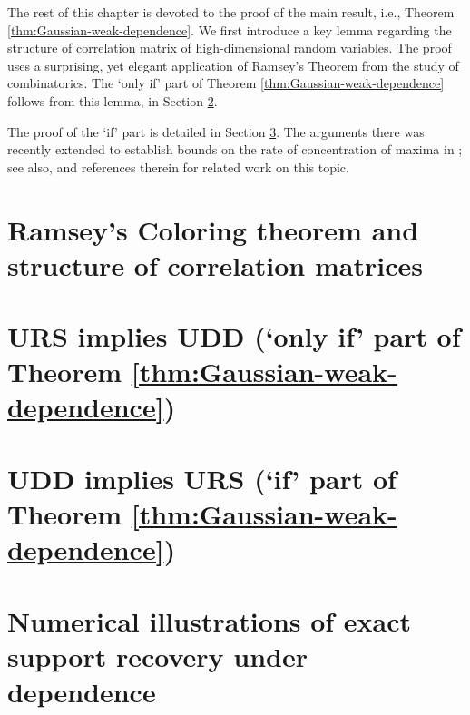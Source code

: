 
\medskip

The rest of this chapter is devoted to the proof of the main result, i.e., Theorem \ref{thm:Gaussian-weak-dependence}. 
We first introduce a key lemma regarding the structure of correlation matrix of high-dimensional random variables.
The proof uses a surprising, yet elegant application of Ramsey's Theorem from the study of combinatorics.
The `only if' part of Theorem \ref{thm:Gaussian-weak-dependence} follows from this lemma, in Section \ref{sec:URS=>UDD}. 

The proof of the `if' part is detailed in Section \ref{sec:UDD=>URS}.
The arguments there was recently extended to establish bounds on the rate of concentration of maxima in \cite{kartsioukas2019rate}; see also, \cite{tanguy2015some} and references therein for related work on this topic.

\section{Ramsey's Coloring theorem and structure of correlation matrices} 
\label{sec:Ramsey}


\section{URS implies UDD (`only if' part of Theorem \ref{thm:Gaussian-weak-dependence})} 
\label{sec:URS=>UDD}


\section{UDD implies URS (`if' part of Theorem \ref{thm:Gaussian-weak-dependence})} 
\label{sec:UDD=>URS}


\section{Numerical illustrations of exact support recovery under dependence}
\label{sec:URS-numerical}

